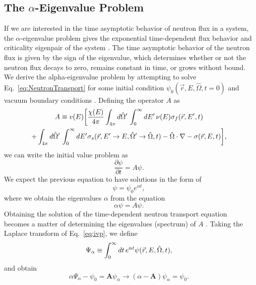 \subsection{The $\alpha$-Eigenvalue Problem}
If we are interested in the time asymptotic behavior of neutron flux in a system, the $\alpha$-eigenvalue problem gives the exponential time-dependent flux behavior and criticality eigenpair of the system \cite{bell_nuclear_1970}. The time asymptotic behavior of the neutron flux is given by the sign of the eigenvalue, which determines whether or not the neutron flux decays to zero, remains constant in time, or grows without bound. We derive the alpha-eigenvalue problem by attempting to solve Eq.~\ref{eq:NeutronTransport} for some initial condition $\psi_{0}(\vec{r},E,\hat{\Omega},t=0)$ and vacuum boundary conditions \cite{lewis_computational_1984}. Defining the operator $A$ as
\begin{multline}
A \equiv v(E) \bigg [ \frac{\chi(E)}{4\pi} \int_{4\pi} \mathop{}\!d \hat{\Omega}' \, \int_{0}^{\infty} \mathop{}\!d E' \, \nu(E) \sigma_{f}(\vec{r},E',t) \\ +\int_{4\pi} \mathop{}\!d \hat{\Omega}' \, \int_{0}^{\infty} \mathop{}\!d E' \sigma_{s}(\vec{r},E'\rightarrow E, \hat{\Omega}' \rightarrow \hat{\Omega},t) - \hat{\Omega} \cdot \nabla - \sigma(\vec{r},E,t) \bigg ],
\end{multline}
we can write the initial value problem as 
\begin{equation}
\frac{\partial \psi}{\partial t} = A \psi.
\label{eq:ivp}
\end{equation}
We expect the previous equation to have solutions in the form of
\begin{equation}
		\psi = \psi_{0} e^{\alpha t},
\end{equation}
where we obtain the eigenvalues $\alpha$ from the equation
\begin{equation}
\alpha \psi = A \psi.
\label{eq:ivp}
	\end{equation}
Obtaining the solution of the time-dependent neutron transport equation becomes a matter of determining the eigenvalues (spectrum) of $A$ \cite{bell_nuclear_1970}. Taking the Laplace transform of Eq.~\ref{eq:ivp}, we define
\begin{equation}
	\Psi_{\alpha} \equiv \int_{0}^{\infty} \mathop{}\!d t \, e^{\alpha t} \psi(\vec{r},E,\hat{\Omega},t), 
\end{equation}
and obtain
\begin{equation}
	\alpha \Psi_{\alpha} - \psi_{0} = \mathbf{A} \psi_{\alpha} \rightarrow (\alpha - \mathbf{A}) \psi_{\alpha} = \psi_{0}.	\end{equation}
